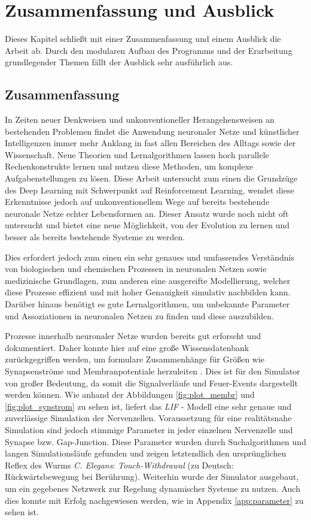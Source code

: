 %
\chapter{Zusammenfassung und Ausblick}
\label{chap:zsm}
%
	Dieses Kapitel schließt mit einer Zusammenfassung und einem Ausblick die Arbeit ab. Durch den modularen Aufbau des Programms und der Erarbeitung grundlegender Themen fällt der Ausblick sehr ausführlich aus.

\section{Zusammenfassung}
\label{sec:erg_zsm}
	In Zeiten neuer Denkweisen und unkonventioneller Herangehensweisen an bestehenden Problemen findet die Anwendung neuronaler Netze und künstlicher Intelligenzen immer mehr Anklang in fast allen Bereichen des Alltags sowie der Wissenschaft. Neue Theorien und Lernalgorithmen lassen hoch parallele Rechenkonstrukte lernen und nutzen diese Methoden, um komplexe Aufgabenstellungen zu lösen. Diese Arbeit untersucht zum einen die Grundzüge des Deep Learning mit Schwerpunkt auf Reinforcement Learning, wendet diese Erkenntnisse jedoch auf unkonventionellem Wege auf bereits bestehende neuronale Netze echter Lebensformen an. Dieser Ansatz wurde noch nicht oft untersucht und bietet eine neue Möglichkeit, von der Evolution zu lernen und besser als bereits bestehende Systeme zu werden.
	
	Dies erfordert jedoch zum einen ein sehr genaues und umfassendes Verständnis von biologischen und chemischen Prozessen in neuronalen Netzen sowie medizinische Grundlagen, zum anderen eine ausgereifte Modellierung, welcher diese Prozesse effizient und mit hoher Genauigkeit simulativ nachbilden kann. Darüber hinaus benötigt es gute Lernalgorithmen, um unbekannte Parameter und Assoziationen in neuronalen Netzen zu finden und diese auszubilden.
	
	Prozesse innerhalb neuronaler Netze wurden bereits gut erforscht und dokumentiert. Daher konnte hier auf eine große Wissensdatenbank zurückgegriffen werden, um formulare Zusammenhänge für Größen wie Synapsenströme und Membranpotentiale herzuleiten \cite{NeuronalDynamics}. Dies ist für den Simulator von großer Bedeutung, da somit die Signalverläufe und Feuer-Events dargestellt werden können. Wie anhand der Abbildungen \ref{fig:plot_membr} und \ref{fig:plot_synstrom} zu sehen ist, liefert das \textit{LIF} - Modell eine sehr genaue und zuverlässige Simulation der Nervenzellen. Voraussetzung für eine realitätsnahe Simulation sind jedoch stimmige Parameter in jeder einzelnen Nervenzelle und Synapse bzw. Gap-Junction. Diese Parameter wurden durch Suchalgorithmen und langen Simulationsläufe gefunden und zeigen letztendlich den ursprünglichen Reflex des Wurms \textit{C. Elegans}: \textit{Touch-Withdrawal} (zu Deutsch: Rückwärtsbewegung bei Berührung). Weiterhin wurde der Simulator ausgebaut, um ein gegebenes Netzwerk zur Regelung dynamischer Systeme zu nutzen. Auch dies konnte mit Erfolg nachgewiesen werden, wie in Appendix \ref{app:parameter} zu sehen ist.
	
